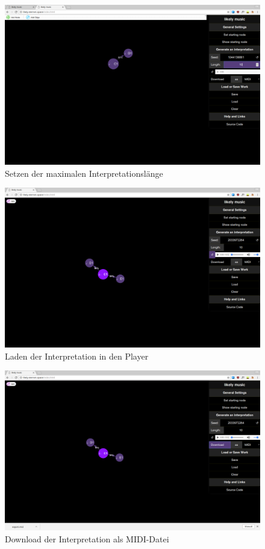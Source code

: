 \documentclass[a4paper,twocolumn]{article}
\begin{document}
\begin{figure}[H]
  \begin{center}
  \includegraphics[width=.7\textwidth]{screenshots/length.png}
  \end{center}
  \caption{Setzen der maximalen Interpretationslänge}
\end{figure}

\begin{figure}[H]
  \begin{center}
  \includegraphics[width=.7\textwidth]{screenshots/reload-player.png}
  \end{center}
  \caption{Laden der Interpretation in den Player}
\end{figure}

\begin{figure}[H]
  \begin{center}
  \includegraphics[width=.7\textwidth]{screenshots/download-midi.png}
  \end{center}
  \caption{Download der Interpretation als MIDI-Datei}
\end{figure}
\end{document}
